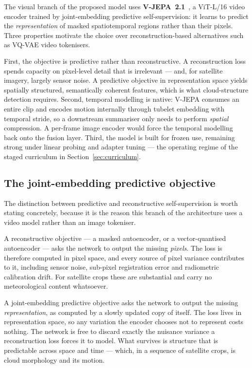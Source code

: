 The visual branch of the proposed model uses \textbf{V-JEPA~2.1}~\cite{vjepa2}, a
ViT-L/16 video encoder trained by joint-embedding predictive self-supervision: it learns to
predict the \emph{representation} of masked spatiotemporal regions rather than their pixels.
Three properties motivate the choice over reconstruction-based alternatives such as
VQ-VAE video tokenisers.

First, the objective is predictive rather than reconstructive. A reconstruction loss spends
capacity on pixel-level detail that is irrelevant --- and, for satellite imagery, largely
sensor noise. A predictive objective in representation space yields spatially structured,
semantically coherent features, which is what cloud-structure detection requires. Second,
temporal modelling is native: V-JEPA consumes an entire clip and encodes motion internally
through tubelet embedding with temporal stride, so a downstream summariser only needs to
perform \emph{spatial} compression. A per-frame image encoder would force the temporal
modelling back onto the fusion layer. Third, the model is built for frozen use, remaining
strong under linear probing and adapter tuning --- the operating regime of the staged
curriculum in Section~\ref{sec:curriculum}.

\subsection{The joint-embedding predictive objective}

The distinction between predictive and reconstructive self-supervision is worth stating
concretely, because it is the reason this branch of the architecture uses a video model
rather than an image tokeniser.

A reconstructive objective --- a masked autoencoder, or a vector-quantised autoencoder ---
asks the network to output the missing \emph{pixels}. The loss is therefore computed in pixel
space, and every source of pixel variance contributes to it, including sensor noise, sub-pixel
registration error and radiometric calibration drift. For satellite crops these are
substantial and carry no meteorological content whatsoever.

A joint-embedding predictive objective asks the network to output the missing
\emph{representation}, as computed by a slowly updated copy of itself. The loss lives in
representation space, so any variation the encoder chooses not to represent costs nothing.
The network is free to discard exactly the nuisance variance a reconstruction loss forces it
to model. What survives is structure that is predictable across space and time --- which, in a
sequence of satellite crops, is cloud morphology and its motion.

